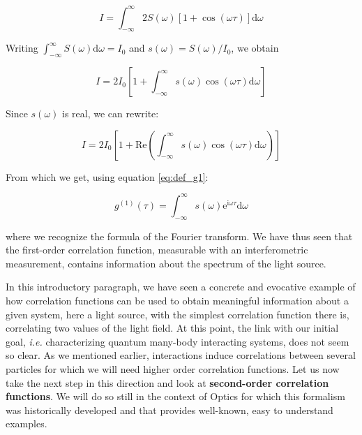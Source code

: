 \begin{equation}
    I=\int_{-\infty}^{\infty} 2 S(\omega)[1+\cos (\omega \tau)] \mathrm{d} \omega
\end{equation}

Writing $\int_{-\infty}^{\infty} S(\omega) \mathrm{d} \omega=I_{0}$ and $s(\omega)=S(\omega) / I_{0}$, we obtain

\begin{equation}
    I=2 I_{0}\left[1+\int_{-\infty}^{\infty} s(\omega) \cos (\omega \tau) \mathrm{d} \omega\right]
\end{equation}

Since $s(\omega)$ is real, we can rewrite:

\begin{equation}
    I=2 I_{0}\left[1+\mathrm{Re} \left(\int_{-\infty}^{\infty} s(\omega) \cos (\omega \tau) \mathrm{d} \omega\right)\right]
\end{equation}

From which we get, using equation \ref{eq:def_g1}:

\begin{equation}
    g^{(1)}(\tau)=\int_{-\infty}^{\infty} s(\omega) \mathrm{e}^{\mathrm{i} \omega \tau} \mathrm{d} \omega
\end{equation}

where we recognize the formula of the Fourier transform. We have thus seen that the first-order correlation function, measurable with an interferometric measurement, contains information about the spectrum of the light source. 




In this introductory paragraph, we have seen a concrete and evocative example of how correlation functions can be used to obtain meaningful information about a given system, here a light source, with the simplest correlation function there is, correlating two values of the light field. At this point, the link with our initial goal, {\it i.e.} characterizing quantum many-body interacting systems, does not seem so clear. As we mentioned earlier, interactions induce correlations between several particles for which we will need higher order correlation functions. Let us now take the next step in this direction and look at \textbf{second-order correlation functions}. We will do so still in the context of Optics for which this formalism was historically developed and that provides well-known, easy to understand examples.

